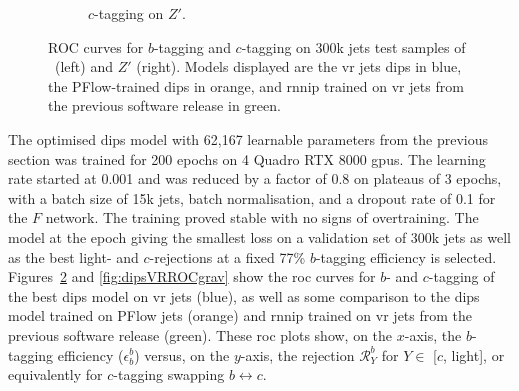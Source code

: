 \begin{figure}[h!]
\begin{subfigure}[t]{0.48\textwidth}
    \caption{$c$-tagging on $Z'$.}
    \label{fig:dipsVRROCzpc}
  \end{subfigure}
  \caption{ROC curves for $b$-tagging and $c$-tagging on 300k jets test samples of \ttb\ (left) and $Z'$ (right). Models displayed are the \gls{vr} jets \gls{dips} in blue, the PFlow-trained \gls{dips} in orange, and \gls{rnnip} trained on \gls{vr} jets from the previous software release in green.}
  \label{fig:dipsVRROC}
\end{figure}

The optimised \gls{dips} model with 62,167 learnable parameters from the previous section was trained for 200 epochs on 4 Quadro RTX 8000 \glspl{gpu}. The learning rate started at 0.001 and was reduced by a factor of 0.8 on plateaus of 3 epochs, with a batch size of 15k jets, batch normalisation, and a dropout rate of 0.1 for the $F$ network. The training proved stable with no signs of overtraining. The model at the epoch giving the smallest loss on a validation set of 300k jets as well as the best light- and $c$-rejections at a fixed 77\% $b$-tagging efficiency is selected. Figures~\ref{fig:dipsVRROC} and \ref{fig:dipsVRROCgrav} show the \gls{roc} curves for $b$- and $c$-tagging of the best \gls{dips} model on \gls{vr} jets (blue), as well as some comparison to the \gls{dips} model trained on PFlow jets (orange) and \gls{rnnip} trained on \gls{vr} jets from the previous software release (green). These \gls{roc} plots show, on the $x$-axis, the $b$-tagging efficiency ($\epsilon^b_b$) versus, on the $y$-axis, the rejection $\mathcal{R}^b_Y$ for $Y \in$ [$c$, light], or equivalently for $c$-tagging swapping $b \leftrightarrow c$.\\

